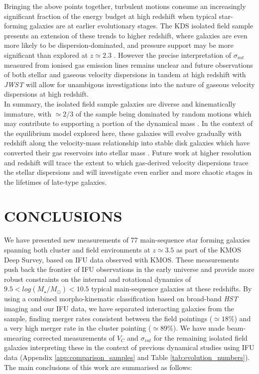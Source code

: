 \documentclass[fleqn,usenatbib]{mn2e}
\begin{document}
Bringing the above points together, turbulent motions consume an increasingly significant fraction of the energy budget at high redshift when typical star-forming galaxies are at earlier evolutionary stages.
The KDS isolated field sample presents an extension of these trends to higher redshift, where galaxies are even more likely to be dispersion-dominated, and pressure support may be more significant than explored at $z\simeq2.3$ \citep{Wuyts2016b,Ubler2017,Genzel2017,Lang2017}.    
However the precise interpretation of $\sigma_{int}$ measured from ionised gas emission lines remains unclear and future observations of both stellar and gaseous velocity dispersions in tandem at high redshift with {\it JWST} will allow for unambigous investigations into the nature of gaseous velocity dispersions at high redshift. \\

In summary, the isolated field sample galaxies are diverse and kinematically immature, with $\simeq2/3$ of the sample being dominated by random motions which may contribute to supporting a portion of the dynamical mass \citep[e.g.][]{Kassin2007,Burkert2010,Kassin2012,Newman2013,Straatman2017,Ubler2017,Lang2017}.
In the context of the equilibrium model explored here, these galaxies will evolve gradually with redshift along the velocity-mass relationship into stable disk galaxies which have converted their gas reservoirs into stellar mass \citep[e.g.][]{Lilly2013,Tacconi2013,Wisnioski2015,Tacconi2017}. 
Future work at higher resolution and redshift will trace the extent to which gas-derived velocity dispersions trace the stellar dispersions and will investigate even earlier and more chaotic stages in the lifetimes of late-type galaxies.

\section{CONCLUSIONS}\label{sec:conclusion}
We have presented new measurements of 77 main-sequence star forming galaxies spanning both cluster and field environments at $z\simeq3.5$ as part of the KMOS Deep Survey, based on IFU data observed with KMOS.
These measurements push back the frontier of IFU observations in the early universe and provide more robust constraints on the internal and rotational dynamics of $9.5 < log(M_{\star}/M_{\odot})< 10.5$ typical main-sequence galaxies at these redshifts.
By using a combined morpho-kinematic classification based on broad-band {\em HST} imaging and our IFU data, we have separated interacting galaxies from the sample, finding merger rates consistent between the field pointings ($\simeq18\%$) and a very high merger rate in the cluster pointing ($\simeq89\%$).
We have made beam-smearing corrected measurements of $V_{C}$ and $\sigma_{int}$ for the remaining isolated field galaxies interpreting these in the context of previous dynamical studies using IFU data (Appendix \ref{app:comparison_samples} and Table \ref{tab:evolution_numbers}).
The main conclusions of this work are summarised as follows:
\end{document}
